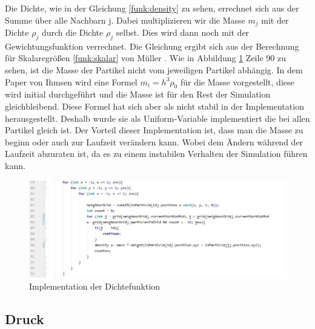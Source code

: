 \documentclass[intern,palatino]{cgBA}
\begin{document}
Die Dichte, wie in der Gleichung \ref{funk:density} zu sehen, errechnet sich aus der Summe über alle Nachbarn j. Dabei multiplizieren wir die Masse $m_j$ mit der Dichte $\rho_j$ durch die Dichte $\rho_j$ selbst. Dies wird dann noch mit der Gewichtungsfunktion verrechnet. Die Gleichung ergibt sich aus der Berechnung für Skalaregrößen \ref{funk:skalar} von Müller \cite{muller2003particle}.
\newline\newline
Wie in Abbildung \ref{img:dichte} Zeile 90 zu sehen, ist die Masse der Partikel nicht vom jeweiligen Partikel abhängig. In dem Paper von Ihmsen \cite{ihmsen2014sph} wird eine Formel $m_i = h^3 \rho_0$ für die Masse vorgestellt, diese wird initial durchgeführt und die Masse ist für den Rest der Simulation gleichbleibend. Diese Formel hat sich aber als nicht stabil in der Implementation herausgestellt. Deshalb wurde sie als Uniform-Variable implementiert die bei allen Partikel gleich ist. Der Vorteil dieser Implementation ist, dass man die Masse zu beginn oder auch zur Laufzeit verändern kann. Wobei dem Ändern während der Laufzeit abzuraten ist, da es zu einem instabilen Verhalten der Simulation führen kann.
\newline

\begin{figure}[H]
	\centering
	\includegraphics[width=1.35\columnwidth]{Bilder/dichte.jpg}
	\caption{Implementation der Dichtefunktion}
	\label{img:dichte}
\end{figure}


\subsection{Druck}\label{druch}
\end{document}
